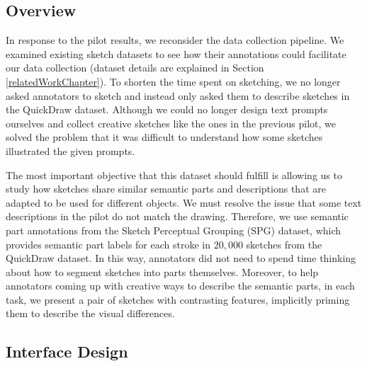 
\subsection{Overview}
In response to the pilot results, we reconsider the data collection pipeline. 
We examined existing sketch datasets to see how their annotations could facilitate our data collection (dataset details are explained in Section \ref{relatedWorkChapter}).    
To shorten the time spent on sketching, we no longer asked annotators to sketch and instead only asked them to describe sketches in the QuickDraw dataset. 
Although we could no longer design text prompts ourselves and collect creative sketches like the ones in the previous pilot, we solved the problem that it was difficult to understand how some sketches illustrated the given prompts. 

The most important objective that this dataset should fulfill is allowing us to study how sketches share similar semantic parts and descriptions that are adapted to be used for different objects. We must resolve the issue that some text descriptions in the pilot do not match the drawing.  
Therefore, we use semantic part annotations from the Sketch Perceptual Grouping (SPG) dataset, which provides semantic part labels for each stroke in $20,000$ sketches from the QuickDraw dataset. In this way, annotators did not need to spend time thinking about how to segment sketches into parts themselves. 
Moreover, to help annotators coming up with creative ways to describe the semantic parts, in each task, we present a pair of sketches with contrasting features, implicitly priming them to describe the visual differences. 

\subsection{Interface Design}


